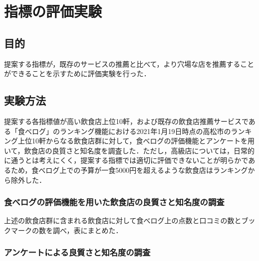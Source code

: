 \chapter{指標の評価実験}



\label{chap:experiment}

\section{目的}
提案する指標が，既存のサービスの推薦と比べて，より穴場な店を推薦することができることを示すために評価実験を行った．
\section{実験方法}

提案する各指標値が高い飲食店上位10軒，および既存の飲食店推薦サービスである「食べログ」のランキング機能における2021年1月19日時点の高松市のランキング上位10軒からなる飲食店群に対して，食べログの評価機能とアンケートを用いて，飲食店の良質さと知名度を調査した．ただし，高級店については，日常的に通うとは考えにくく，提案する指標では適切に評価できないことが明らかであるため，食べログ上での予算が一食5000円を超えるような飲食店はランキングから除外した．
	\subsection{食べログの評価機能を用いた飲食店の良質さと知名度の調査}\label{exp:scrutiny}

		上述の飲食店群に含まれる飲食店に対して食べログ上の点数と口コミの数とブックマークの数を調べ，表にまとめた．

	\subsection{アンケートによる良質さと知名度の調査}\label{exp:questionnaire}

